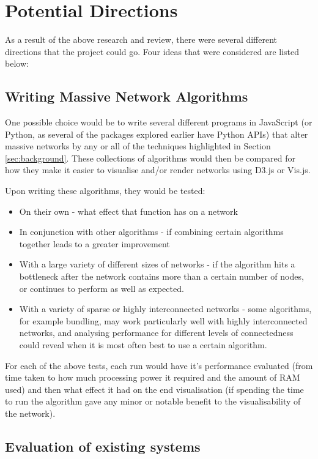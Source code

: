\documentclass[../dissertation.tex]{subfiles}
\begin{document}
\section{Potential Directions}

As a result of the above research and review, there were several different directions that the project could go. Four ideas that were considered are listed below:

\subsection{Writing Massive Network Algorithms}

One possible choice would be to write several different programs in JavaScript (or Python, as several of the packages explored earlier have Python APIs) that alter massive networks by any or all of the techniques highlighted in Section \ref{sec:background}. These collections of algorithms would then be compared for how they make it easier to visualise and/or render networks using D3.js or Vis.js. 

Upon writing these algorithms, they would be tested:
\begin{itemize}
    \item On their own - what effect that function has on a network
    \item In conjunction with other algorithms - if combining certain algorithms together leads to a greater improvement
    \item With a large variety of different sizes of networks - if the algorithm hits a bottleneck after the network contains more than a certain number of nodes, or continues to perform as well as expected.
    \item With a variety of sparse or highly interconnected networks - some algorithms, for example bundling, may work particularly well with highly interconnected networks, and analysing performance for different levels of connectedness could reveal when it is most often best to use a certain algorithm.
\end{itemize}

For each of the above tests, each run would have it's performance evaluated (from time taken to how much processing power it required and the amount of RAM used) and then what effect it had on the end visualisation (if spending the time to run the algorithm gave any minor or notable benefit to the visualisability of the network).

\subsection{Evaluation of existing systems}
\end{document}
